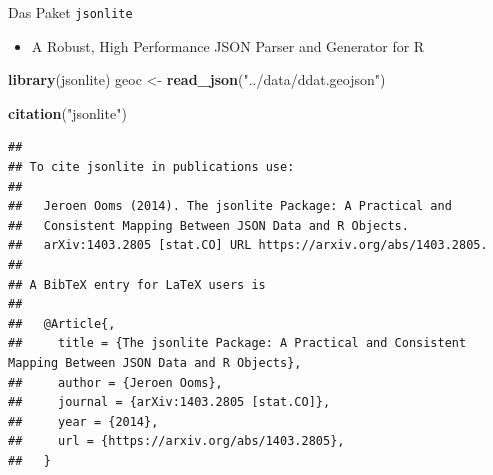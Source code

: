 \documentclass[ignorenonframetext,]{beamer}
\newenvironment{Shaded}{\begin{snugshade}}{\end{snugshade}}
\newcommand{\KeywordTok}[1]{\textcolor[rgb]{0.26,0.66,0.93}{\textbf{#1}}}
\newcommand{\NormalTok}[1]{\textcolor[rgb]{0.74,0.68,0.62}{#1}}
\newcommand{\StringTok}[1]{\textcolor[rgb]{0.02,0.61,0.04}{#1}}
\providecommand{\tightlist}{%
  \setlength{\itemsep}{0pt}\setlength{\parskip}{0pt}}
\begin{document}
\begin{frame}[fragile]{Das Paket \texttt{jsonlite}}
\protect\hypertarget{das-paket-jsonlite}{}

\begin{itemize}
\tightlist
\item
  A Robust, High Performance JSON Parser and Generator for R
\end{itemize}

\begin{Shaded}
\begin{Highlighting}[]
\KeywordTok{library}\NormalTok{(jsonlite)}
\NormalTok{geoc <-}\StringTok{ }\KeywordTok{read_json}\NormalTok{(}\StringTok{"../data/ddat.geojson"}\NormalTok{)}
\end{Highlighting}
\end{Shaded}

\begin{Shaded}
\begin{Highlighting}[]
\KeywordTok{citation}\NormalTok{(}\StringTok{"jsonlite"}\NormalTok{)}
\end{Highlighting}
\end{Shaded}

\begin{verbatim}
## 
## To cite jsonlite in publications use:
## 
##   Jeroen Ooms (2014). The jsonlite Package: A Practical and
##   Consistent Mapping Between JSON Data and R Objects.
##   arXiv:1403.2805 [stat.CO] URL https://arxiv.org/abs/1403.2805.
## 
## A BibTeX entry for LaTeX users is
## 
##   @Article{,
##     title = {The jsonlite Package: A Practical and Consistent Mapping Between JSON Data and R Objects},
##     author = {Jeroen Ooms},
##     journal = {arXiv:1403.2805 [stat.CO]},
##     year = {2014},
##     url = {https://arxiv.org/abs/1403.2805},
##   }
\end{verbatim}

\end{frame}
\end{document}
